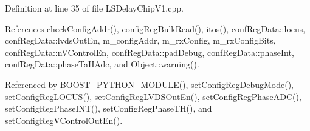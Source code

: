 Definition at line 35 of file L\+S\+Delay\+Chip\+V1.\+cpp.



References check\+Config\+Addr(), config\+Reg\+Bulk\+Read(), itos(), conf\+Reg\+Data\+::locus, conf\+Reg\+Data\+::lvds\+Out\+En, m\+\_\+config\+Addr, m\+\_\+rx\+Config, m\+\_\+rx\+Config\+Bits, conf\+Reg\+Data\+::n\+V\+Control\+En, conf\+Reg\+Data\+::pad\+Debug, conf\+Reg\+Data\+::phase\+Int, conf\+Reg\+Data\+::phase\+Ta\+H\+Adc, and Object\+::warning().



Referenced by B\+O\+O\+S\+T\+\_\+\+P\+Y\+T\+H\+O\+N\+\_\+\+M\+O\+D\+U\+L\+E(), set\+Config\+Reg\+Debug\+Mode(), set\+Config\+Reg\+L\+O\+C\+U\+S(), set\+Config\+Reg\+L\+V\+D\+S\+Out\+En(), set\+Config\+Reg\+Phase\+A\+D\+C(), set\+Config\+Reg\+Phase\+I\+N\+T(), set\+Config\+Reg\+Phase\+T\+H(), and set\+Config\+Reg\+V\+Control\+Out\+En().


